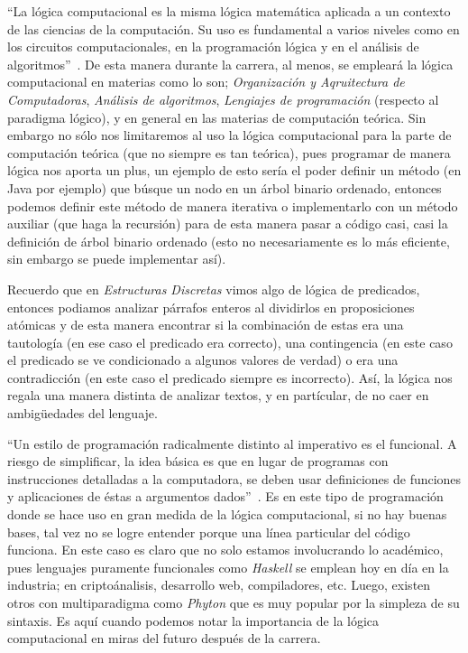 \documentclass{article}
\begin{document}
\begin{enumerate}
    ``La lógica computacional es la misma lógica matemática aplicada a un
  contexto de las ciencias de la computación. Su uso es fundamental a
  varios niveles como en los circuitos computacionales, en la programación
  lógica y en el análisis de algoritmos''~\cite{TPERAZA}. De esta manera
  durante la carrera, al menos, se empleará la lógica computacional en materias
  como lo son; \textit{Organización y Aqruitectura de Computadoras},
  \textit{Análisis de algoritmos}, \textit{Lengiajes de programación} (respecto
  al paradigma lógico), y en general en las materias de computación teórica.
  Sin embargo no sólo nos limitaremos al uso la lógica computacional para la
  parte de computación teórica (que no siempre es tan teórica), pues programar
  de manera lógica nos aporta un plus, un ejemplo de esto sería el poder
  definir un método (en Java por ejemplo) que búsque un nodo en un árbol
  binario ordenado, entonces podemos definir este método de manera iterativa
  o implementarlo con un método auxiliar (que haga la recursión) para
  de esta  manera pasar a código casi, casi la definición de árbol binario
  ordenado (esto no necesariamente es lo más eficiente, sin embargo se puede
  implementar así).
  
  Recuerdo que en \textit{Estructuras Discretas} vimos algo de lógica de
  predicados, entonces podiamos analizar párrafos enteros al dividirlos
  en proposiciones atómicas y de esta manera encontrar si la combinación
  de estas era una tautología (en ese caso el predicado era correcto),
  una contingencia (en este caso el predicado se ve condicionado a algunos
  valores de verdad) o era una contradicción (en este caso el predicado
  siempre es incorrecto). Así, la lógica nos regala una manera distinta
  de analizar textos, y en partícular, de no caer en ambigüedades del
  lenguaje.
  
  ``Un estilo de programación radicalmente distinto al imperativo es el
  funcional. A riesgo de simpliﬁcar, la idea básica es que en lugar de
  programas con instrucciones detalladas a la computadora, se deben usar
  deﬁniciones de funciones y aplicaciones de éstas a argumentos
  dados''~\cite{FHQ}. Es en este tipo de programación donde se hace uso
  en gran medida de la lógica computacional, si no hay buenas bases, tal
  vez no se logre entender porque una línea particular del código funciona.
  En este caso es claro que no solo estamos involucrando lo académico,
  pues lenguajes puramente funcionales como \textit{Haskell} se emplean
  hoy en día en la industria; en criptoánalisis, desarrollo web, compiladores,
  etc. Luego, existen otros con multiparadigma como \textit{Phyton} que
  es muy popular por la simpleza de su sintaxis. Es aquí cuando podemos
  notar la importancia de la lógica computacional en miras del futuro
  después de la carrera.
  

\end{enumerate}
\end{document}
